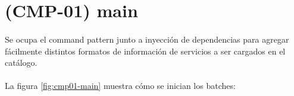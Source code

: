 \section{(CMP-01) main}\label{sec:cmp-01}

\paragraph{}
Se ocupa el command pattern junto a inyecci\'on de dependencias
para agregar f\'acilmente distintos formatos de informaci\'on de servicios
a ser cargados en el cat\'alogo.

\paragraph{}
La figura \ref{fig:cmp01-main} muestra c\'omo se inician los batches:

